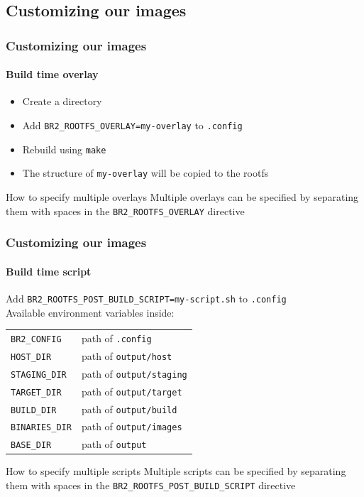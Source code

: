 \documentclass{beamer}
\begin{document}
\subsection{Customizing our images}
\begin{frame}
  \frametitle{Customizing our images}
  \framesubtitle{Build time overlay}
  \begin{itemize}
    \item Create a directory
    \item Add \texttt{BR2\_ROOTFS\_OVERLAY=my-overlay} to \texttt{.config}
    \item Rebuild using \texttt{make}
    \item The structure of \texttt{my-overlay} will be copied to the rootfs
  \end{itemize}
  \begin{block}{How to specify multiple overlays}
    Multiple overlays can be specified by separating them with spaces in the \texttt{BR2\_ROOTFS\_OVERLAY} directive
  \end{block}
\end{frame}
\begin{frame}
  \frametitle{Customizing our images}
  \framesubtitle{Build time script}
  Add \texttt{BR2\_ROOTFS\_POST\_BUILD\_SCRIPT=my-script.sh} to \texttt{.config} \\
  Available environment variables inside:
  \begin{table}
    \begin{center}
      \begin{tabular}{ll}
        \texttt{BR2\_CONFIG} & path of \texttt{.config} \\
        \texttt{HOST\_DIR} & path of \texttt{output/host} \\
        \texttt{STAGING\_DIR} & path of \texttt{output/staging} \\
        \texttt{TARGET\_DIR} & path of \texttt{output/target} \\
        \texttt{BUILD\_DIR} & path of \texttt{output/build} \\
        \texttt{BINARIES\_DIR} & path of \texttt{output/images} \\
        \texttt{BASE\_DIR} & path of \texttt{output} \\
      \end{tabular}
    \end{center}
  \end{table}
  \begin{block}{How to specify multiple scripts}
    Multiple scripts can be specified by separating them with spaces in the \texttt{BR2\_ROOTFS\_POST\_BUILD\_SCRIPT} directive
  \end{block}
\end{frame}
\end{document}
